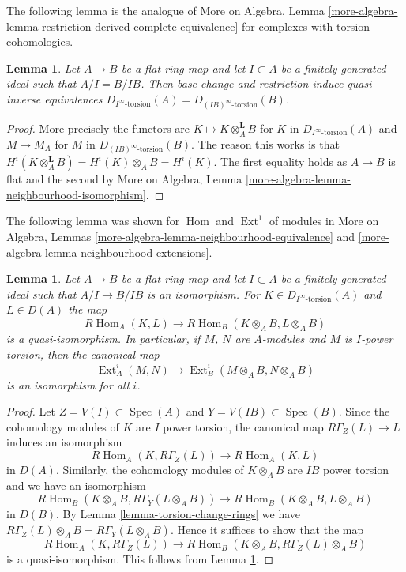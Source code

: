 \documentclass{stacks-project}
\theoremstyle{plain}
\newtheorem{lemma}[subsection]{Lemma}
\theoremstyle{definition}
\theoremstyle{remark}
\numberwithin{equation}{subsection}
\def\Spec{\mathop{\mathrm{Spec}}}
\def\Hom{\mathop{\mathrm{Hom}}\nolimits}
\def\Ext{\mathop{\mathrm{Ext}}\nolimits}
\begin{document}
\noindent
The following lemma is the analogue of
More on Algebra, Lemma
\ref{more-algebra-lemma-restriction-derived-complete-equivalence}
for complexes with torsion cohomologies.

\begin{lemma}
\label{lemma-torsion-flat-change-rings}
Let $A \to B$ be a flat ring map and let $I \subset A$ be a finitely
generated ideal such that $A/I = B/IB$. Then base change and
restriction induce quasi-inverse equivalences
$D_{I^\infty\text{-torsion}}(A) = D_{(IB)^\infty\text{-torsion}}(B)$.
\end{lemma}

\begin{proof}
More precisely the functors are $K \mapsto K \otimes_A^\mathbf{L} B$
for $K$ in $D_{I^\infty\text{-torsion}}(A)$ and $M \mapsto M_A$
for $M$ in $D_{(IB)^\infty\text{-torsion}}(B)$. The reason this works
is that $H^i(K \otimes_A^\mathbf{L} B) = H^i(K) \otimes_A B = H^i(K)$.
The first equality holds as $A \to B$ is flat and the second by
More on Algebra, Lemma \ref{more-algebra-lemma-neighbourhood-isomorphism}.
\end{proof}

\noindent
The following lemma was shown for $\Hom$ and $\Ext^1$ of modules in
More on Algebra, Lemmas \ref{more-algebra-lemma-neighbourhood-equivalence} and
\ref{more-algebra-lemma-neighbourhood-extensions}.

\begin{lemma}
\label{lemma-neighbourhood-extensions}
Let $A \to B$ be a flat ring map and let $I \subset A$ be a
finitely generated ideal such that $A/I \to B/IB$ is an isomorphism.
For $K \in D_{I^\infty\text{-torsion}}(A)$ and $L \in D(A)$
the map
$$
R\Hom_A(K, L) \longrightarrow R\Hom_B(K \otimes_A B, L \otimes_A B)
$$
is a quasi-isomorphism. In particular, if $M$, $N$ are $A$-modules and
$M$ is $I$-power torsion, then the canonical map
$$
\Ext^i_A(M, N)
\longrightarrow
\Ext^i_B(M \otimes_A B, N \otimes_A B)
$$
is an isomorphism for all $i$. 
\end{lemma}

\begin{proof}
Let $Z = V(I) \subset \Spec(A)$ and $Y = V(IB) \subset \Spec(B)$.
Since the cohomology modules of $K$ are $I$ power torsion, the
canonical map $R\Gamma_Z(L) \to L$ induces an isomorphism
$$
R\Hom_A(K, R\Gamma_Z(L)) \to R\Hom_A(K, L)
$$
in $D(A)$. Similarly, the cohomology modules of $K \otimes_A B$ are
$IB$ power torsion and we have an isomorphism
$$
R\Hom_B(K \otimes_A B, R\Gamma_Y(L \otimes_A B)) \to 
R\Hom_B(K \otimes_A B, L \otimes_A B)
$$
in $D(B)$.
By Lemma \ref{lemma-torsion-change-rings} we have
$R\Gamma_Z(L) \otimes_A B = R\Gamma_Y(L \otimes_A B)$.
Hence it suffices to show that the map
$$
R\Hom_A(K, R\Gamma_Z(L)) \to R\Hom_B(K \otimes_A B, R\Gamma_Z(L) \otimes_A B)
$$
is a quasi-isomorphism. This follows from
Lemma \ref{lemma-torsion-flat-change-rings}.
\end{proof}
\end{document}

